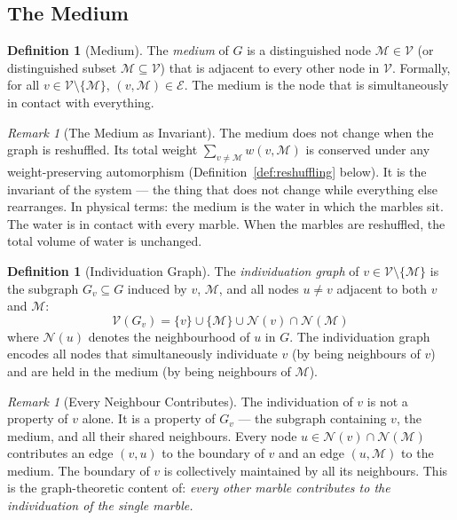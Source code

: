 \documentclass[12pt, a4paper]{article}
\theoremstyle{plain}
\theoremstyle{definition}
\newtheorem{definition}[theorem]{Definition}
\theoremstyle{remark}
\newtheorem{remark}[theorem]{Remark}
\newcommand{\med}{\mathcal{M}}
\newcommand{\Nbd}{\mathcal{N}}
\newcommand{\Ecal}{\mathcal{E}}
\newcommand{\Vcal}{\mathcal{V}}
\begin{document}
\subsection{The Medium}

\begin{definition}[Medium]
\label{def:medium}
The \emph{medium} of $G$ is a distinguished node $\med \in \Vcal$ (or
distinguished subset $\med \subseteq \Vcal$) that is adjacent to every
other node in $\Vcal$. Formally, for all $v \in \Vcal \setminus \{\med\}$,
$(v, \med) \in \Ecal$. The medium is the node that is simultaneously in
contact with everything.
\end{definition}

\begin{remark}[The Medium as Invariant]
\label{rem:medium_invariant}
The medium does not change when the graph is reshuffled. Its total weight
$\sum_{v \neq \med} w(v, \med)$ is conserved under any weight-preserving
automorphism (Definition~\ref{def:reshuffling} below). It is the invariant
of the system --- the thing that does not change while everything else
rearranges. In physical terms: the medium is the water in which the marbles
sit. The water is in contact with every marble. When the marbles are
reshuffled, the total volume of water is unchanged.
\end{remark}

\begin{definition}[Individuation Graph]
\label{def:indgraph}
The \emph{individuation graph} of $v \in \Vcal \setminus \{\med\}$ is the
subgraph $G_v \subseteq G$ induced by $v$, $\med$, and all nodes $u \neq v$
adjacent to both $v$ and $\med$:
\[
  \Vcal(G_v) = \{v\} \cup \{\med\} \cup \Nbd(v) \cap \Nbd(\med)
\]
where $\Nbd(u)$ denotes the neighbourhood of $u$ in $G$. The individuation
graph encodes all nodes that simultaneously individuate $v$ (by being
neighbours of $v$) and are held in the medium (by being neighbours of $\med$).
\end{definition}

\begin{remark}[Every Neighbour Contributes]
\label{rem:collective}
The individuation of $v$ is not a property of $v$ alone. It is a property
of $G_v$ --- the subgraph containing $v$, the medium, and all their shared
neighbours. Every node $u \in \Nbd(v) \cap \Nbd(\med)$ contributes an edge
$(v,u)$ to the boundary of $v$ and an edge $(u, \med)$ to the medium. The
boundary of $v$ is collectively maintained by all its neighbours. This is
the graph-theoretic content of: \emph{every other marble contributes to the
individuation of the single marble.}
\end{remark}
\end{document}
